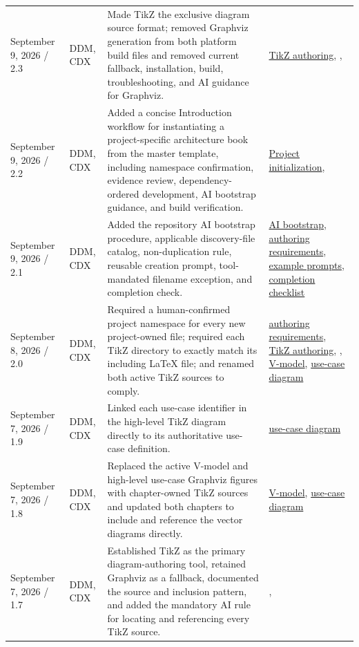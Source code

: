 \begin{tabularx}{\linewidth}{L{3.1cm}L{2.2cm}YL{2.0cm}}
September 9, 2026 / 2.3 & DDM, CDX & Made TikZ the exclusive diagram source format; removed Graphviz generation from both platform build files and removed current fallback, installation, build, troubleshooting, and AI guidance for Graphviz. & \hyperref[Section:TikZAuthoring]{TikZ authoring}, , \\
September 9, 2026 / 2.2 & DDM, CDX & Added a concise Introduction workflow for instantiating a project-specific architecture book from the master template, including namespace confirmation, evidence review, dependency-ordered development, AI bootstrap guidance, and build verification. & \hyperref[Section:InitializeNewProject]{Project initialization}, \\
September 9, 2026 / 2.1 & DDM, CDX & Added the repository AI bootstrap procedure, applicable discovery-file catalog, non-duplication rule, reusable creation prompt, tool-mandated filename exception, and completion check. & \hyperref[Section:AIRepositoryBootstrap]{AI bootstrap}, \hyperref[Table:DocumentAuthoringRequirements]{authoring requirements}, \hyperref[Section:AIExamplePrompts]{example prompts}, \hyperref[Table:AICompletionChecklist]{completion checklist}\\
September 8, 2026 / 2.0 & DDM, CDX & Required a human-confirmed project namespace for every new project-owned file; required each TikZ directory to exactly match its including LaTeX file; and renamed both active TikZ sources to comply. & \hyperref[Table:DocumentAuthoringRequirements]{authoring requirements}, \hyperref[Section:TikZAuthoring]{TikZ authoring}, , \hyperref[Figure:VModel]{V-model}, \hyperref[Figure:UseCaseDiagram]{use-case diagram}\\
September 7, 2026 / 1.9 & DDM, CDX & Linked each use-case identifier in the high-level TikZ diagram directly to its authoritative use-case definition. & \hyperref[Figure:UseCaseDiagram]{use-case diagram}\\
September 7, 2026 / 1.8 & DDM, CDX & Replaced the active V-model and high-level use-case Graphviz figures with chapter-owned TikZ sources and updated both chapters to include and reference the vector diagrams directly. & \hyperref[Figure:VModel]{V-model}, \hyperref[Figure:UseCaseDiagram]{use-case diagram}\\
September 7, 2026 / 1.7 & DDM, CDX & Established TikZ as the primary diagram-authoring tool, retained Graphviz as a fallback, documented the source and inclusion pattern, and added the mandatory AI rule for locating and referencing every TikZ source. & , \\

\end{tabularx}
